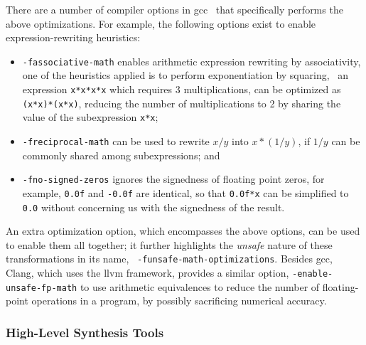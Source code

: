 There are a number of compiler options in \gls{gcc}~\cite{gcc} that
specifically performs the above optimizations.  For example, the following
options exist to enable expression-rewriting heuristics:
\begin{itemize}

    \item \verb|-fassociative-math| enables arithmetic expression rewriting by
    associativity, one of the heuristics applied is to perform exponentiation
    by squaring, \eg~an expression \verb|x*x*x*x| which requires 3
    multiplications, can be optimized as \verb|(x*x)*(x*x)|, reducing the
    number of multiplications to 2 by sharing the value of the subexpression
    \verb|x*x|;

    \item \verb|-freciprocal-math| can be used to rewrite $x / y$ into $x * (1
    / y)$, if $1 / y$ can be commonly shared among subexpressions; and

    \item \verb|-fno-signed-zeros| ignores the signedness of floating point
    zeros, for example, \verb|0.0f| and \verb|-0.0f| are identical, so that
    \verb|0.0f*x| can be simplified to \verb|0.0| without concerning us with
    the signedness of the result.

\end{itemize}

An extra optimization option, which encompasses the above options, can be used
to enable them all together; it further highlights the \emph{unsafe} nature
of these transformations in its name, \ie~\verb|-funsafe-math-optimizations|.
Besides \gls{gcc}, Clang, which uses the \gls{llvm} framework, provides a
similar option, \verb|-enable-unsafe-fp-math| to use arithmetic equivalences
to reduce the number of floating-point operations in a program, by possibly
sacrificing numerical accuracy.


\subsubsection{High-Level Synthesis Tools}

